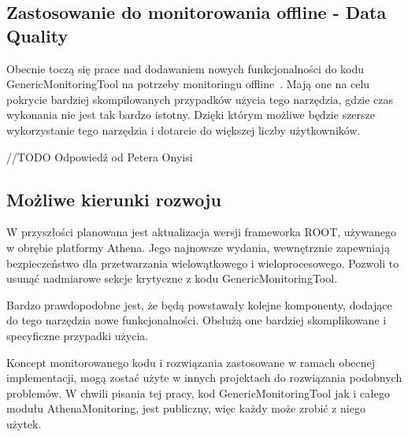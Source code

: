 \subsection{Zastosowanie do monitorowania offline - Data Quality}
Obecnie toczą się prace nad dodawaniem nowych funkcjonalności do kodu GenericMonitoringTool na potrzeby monitoringu offline~\cite{atlas-multithread-article}.
Mają one na celu pokrycie bardziej skompilowanych przypadków użycia tego narzędzia, gdzie czas wykonania nie jest tak bardzo istotny. 
Dzięki którym możliwe będzie szersze wykorzystanie tego narzędzia i dotarcie do większej liczby użytkowników. 

//TODO Odpowiedź od Petera Onyisi 

\subsection{Możliwe kierunki rozwoju}
W przyszłości planowana jest aktualizacja wersji frameworka ROOT, używanego w obrębie platformy Athena.
Jego najnowsze wydania, wewnętrznie zapewniają bezpieczeństwo dla przetwarzania wielowątkowego i wieloprocesowego.
Pozwoli to usunąć nadmiarowe sekcje krytyczne z kodu GenericMonitoringTool.

Bardzo prawdopodobne jest, że będą powstawały kolejne komponenty, dodające do tego narzędzia nowe funkcjonalności.
Obsłużą one bardziej skomplikowane i specyficzne przypadki użycia.  

Koncept monitorowanego kodu i rozwiązania zastosowane w ramach obecnej implementacji, mogą zostać użyte w innych projektach do rozwiązania podobnych problemów.
W chwili pisania tej pracy, kod GenericMonitoringTool jak i całego modułu AthenaMonitoring, jest publiczny, więc każdy może zrobić z niego użytek. 
